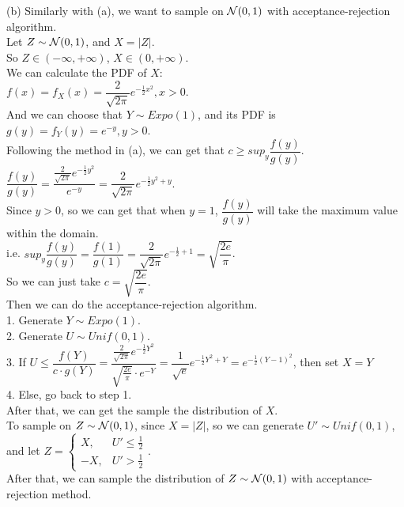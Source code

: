 \begin{homeworkProblem}
(b) Similarly with (a), we want to sample on $\mathcal{N}(0,1)$ with acceptance-rejection algorithm. \\
Let $Z\sim \mathcal{N}(0,1)$, and $X=|Z|$. \\
So $Z\in (-\infty,+\infty)$, $X\in (0,+\infty)$. \\
We can calculate the PDF of $X$: \\
$f(x)=f_X(x)=\dfrac{2}{\sqrt{2\pi}}e^{-\frac{1}{2}x^2},x>0$. \\

And we can choose that $Y\sim Expo(1)$, and its PDF is $g(y)=f_Y(y)=e^{-y},y>0$. \\
Following the method in (a), we can get that $c\geq sup_y\dfrac{f(y)}{g(y)}$. \\
$\dfrac{f(y)}{g(y)}=\dfrac{\frac{2}{\sqrt{2\pi}}e^{-\frac{1}{2}y^2}}{e^{-y}}=\dfrac{2}{\sqrt{2\pi}}e^{-\frac{1}{2}y^2+y}$. \\
Since $y>0$, so we can get that when $y=1$, $\dfrac{f(y)}{g(y)}$ will take the maximum value within the domain. \\
i.e. $sup_y\dfrac{f(y)}{g(y)}=\dfrac{f(1)}{g(1)}=\dfrac{2}{\sqrt{2\pi}}e^{-\frac{1}{2}+1}=\sqrt{\dfrac{2e}{\pi}}$. \\
So we can just take $c=\sqrt{\dfrac{2e}{\pi}}$. \\

Then we can do the acceptance-rejection algorithm. \\
1. Generate $Y\sim Expo(1)$. \\
2. Generate $U\sim Unif(0,1)$. \\
3. If $U\leq \dfrac{f(Y)}{c\cdot g(Y)}=\dfrac{\frac{2}{\sqrt{2\pi}}e^{-\frac{1}{2}Y^2}}{\sqrt{\frac{2e}{\pi}}\cdot e^{-Y}}=\dfrac{1}{\sqrt{e}}e^{-\frac{1}{2}Y^2+Y}=e^{-\frac{1}{2}(Y-1)^2}$, then set $X=Y$ \\
4. Else, go back to step 1. \\

After that, we can get the sample the distribution of $X$. \\
To sample on $Z\sim \mathcal{N}(0,1)$, since $X=|Z|$, so we can generate $U'\sim Unif(0,1)$, \\
and let $Z=\begin{cases}
    X, & U'\leq \frac{1}{2} \\
    -X, & U'>\frac{1}{2}
\end{cases}$. \\
After that, we can sample the distribution of $Z\sim \mathcal{N}(0,1)$ with acceptance-rejection method. \\


\end{homeworkProblem}

